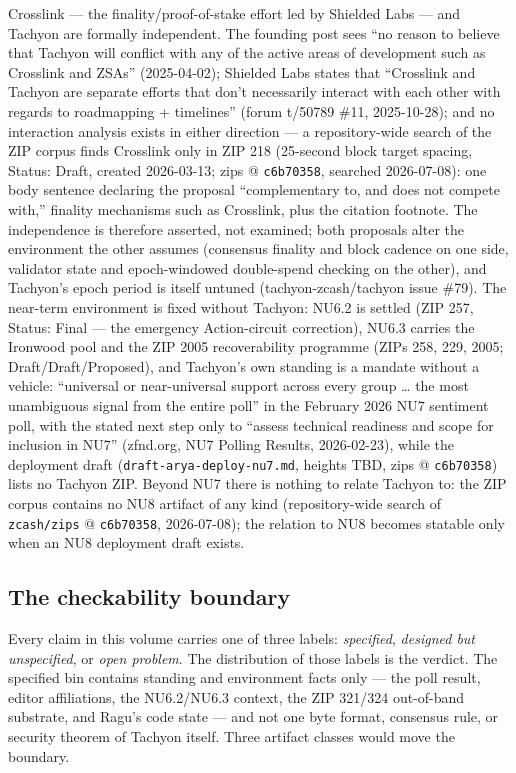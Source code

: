 \documentclass[11pt,a4paper]{article}
\theoremstyle{definition}
\begin{document}
Crosslink --- the finality/proof-of-stake effort led by Shielded Labs ---
and Tachyon are formally independent. The founding post sees ``no reason to
believe that Tachyon will conflict with any of the active areas of
development such as Crosslink and ZSAs'' (2025-04-02);
Shielded Labs states that ``Crosslink and Tachyon are separate efforts that
don't necessarily interact with each other with regards to roadmapping +
timelines'' (forum t/50789 \#11, 2025-10-28); and no interaction analysis
exists in either direction --- a repository-wide search of the ZIP corpus
finds Crosslink only in ZIP 218 (25-second block target spacing, Status:
Draft, created 2026-03-13; zips @ \texttt{c6b70358}, searched 2026-07-08):
one body sentence declaring the proposal ``complementary to, and does not
compete with,'' finality mechanisms such as Crosslink, plus the citation
footnote. The independence is therefore
asserted, not examined; both proposals alter the environment the other
assumes (consensus finality and block cadence on one side, validator state
and epoch-windowed double-spend checking on the other), and Tachyon's epoch
period is itself untuned (tachyon-zcash/tachyon issue \#79). The near-term
environment is fixed without Tachyon: NU6.2 is settled (ZIP 257, Status:
Final --- the emergency Action-circuit correction), NU6.3 carries the
Ironwood pool and the ZIP 2005 recoverability programme (ZIPs 258, 229,
2005; Draft/Draft/Proposed), and Tachyon's own standing is a mandate
without a vehicle: ``universal or near-universal support across every group
\ldots{} the most unambiguous signal from the entire poll'' in the February
2026 NU7 sentiment poll, with the stated next step only to ``assess
technical readiness and scope for inclusion in NU7'' (zfnd.org, NU7 Polling
Results, 2026-02-23), while the deployment draft
(\texttt{draft-arya-deploy-nu7.md}, heights TBD, zips @ \texttt{c6b70358})
lists no Tachyon ZIP. Beyond NU7 there is nothing to relate Tachyon to: the
ZIP corpus contains no NU8 artifact of any kind (repository-wide search of
\texttt{zcash/zips} @ \texttt{c6b70358}, 2026-07-08); the relation to NU8
becomes statable only when an NU8 deployment draft exists.

\subsection{The checkability boundary}\label{sec:tachyon-checkability}

Every claim in this volume carries one of three labels: \emph{specified},
\emph{designed but unspecified}, or \emph{open problem}. The distribution
of those labels is the verdict. The specified bin contains standing and
environment facts only --- the poll result, editor affiliations, the
NU6.2/NU6.3 context, the ZIP 321/324 out-of-band substrate, and Ragu's code
state --- and not one byte format, consensus rule, or security theorem of
Tachyon itself. Three artifact classes would move the boundary.
\end{document}
